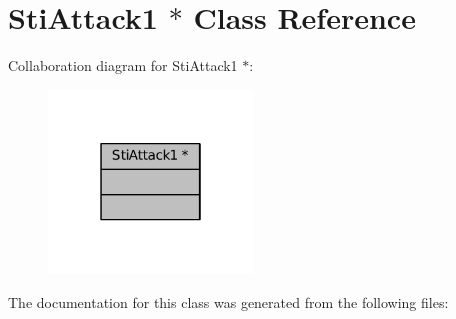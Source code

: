 \hypertarget{classStiAttack1_01_5}{}\section{Sti\+Attack1 $\ast$ Class Reference}
\label{classStiAttack1_01_5}


Collaboration diagram for Sti\+Attack1 $\ast$\+:
\nopagebreak
\begin{figure}[H]
\begin{center}
\leavevmode
\includegraphics[width=154pt]{classStiAttack1_01_5__coll__graph}
\end{center}
\end{figure}


The documentation for this class was generated from the following files\+: